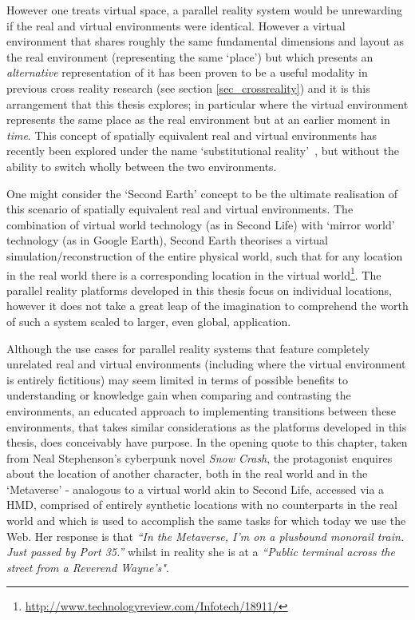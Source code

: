 However one treats virtual space, a parallel reality system would be unrewarding if the real and virtual environments were identical\turklevrfootnote{}. However a virtual environment that shares roughly the same fundamental dimensions and layout as the real environment (representing the same `place') but which presents an \textit{alternative} representation of it has been proven to be a useful modality in previous cross reality research (see section \ref{sec_crossreality}) and it is this arrangement that this thesis explores; in particular where the virtual environment represents the same place as the real environment but at an earlier moment in \textit{time}. This concept of spatially equivalent real and virtual environments has recently been explored under the name `substitutional reality'~\cite{Simeone2015}, but without the ability to switch wholly between the two environments.

One might consider the `Second Earth' concept to be the ultimate realisation of this scenario of spatially equivalent real and virtual environments. The combination of virtual world technology (as in Second Life) with `mirror world' technology (as in Google Earth), Second Earth theorises a virtual simulation/reconstruction of the entire physical world, such that for any location in the real world there is a corresponding location in the virtual world\footnote{\url{http://www.technologyreview.com/Infotech/18911/}}. The parallel reality platforms developed in this thesis focus on individual locations, however it does not take a great leap of the imagination to comprehend the worth of such a system scaled to larger, even global, application.

Although the use cases for parallel reality systems that feature completely unrelated real and virtual environments (including where the virtual environment is entirely fictitious) may seem limited in terms of possible benefits to understanding or knowledge gain when comparing and contrasting the environments, an educated approach to implementing transitions between these environments, that takes similar considerations as the platforms developed in this thesis, does conceivably have purpose. In the opening quote to this chapter, taken from Neal Stephenson's cyberpunk novel \textit{Snow Crash}, the protagonist enquires about the location of another character, both in the real world and in the `Metaverse' - analogous to a virtual world akin to Second Life, accessed via a HMD, comprised of entirely synthetic locations with no counterparts in the real world and which is used to accomplish the same tasks for which today we use the Web. Her response is that \textit{``In  the Metaverse, I'm on a plusbound monorail train. Just passed by Port 35.''} whilst in reality she is at a \textit{``Public terminal across the street from a Reverend Wayne's"}.

